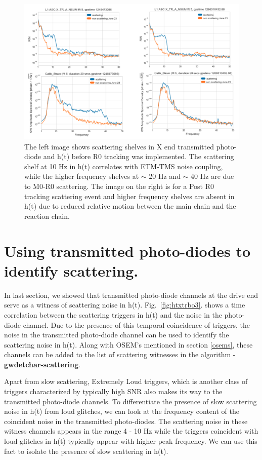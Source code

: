 \documentclass[12pt]{iopart}
\begin{document}
\begin{figure}[h]
    \centering
    \includegraphics[width=\textwidth]{etm-transmon.png}
    \caption{The left image shows scattering shelves in X end transmitted photo-diode and h(t) before R0 tracking was implemented. The scattering shelf at 10 Hz in h(t) correlates with ETM-TMS noise coupling, while the higher frequency shelves at $\sim$ 20 Hz and $\sim$ 40 Hz are due to M0-R0 scattering. The image on the right is for a Post R0 tracking scattering event and higher frequency shelves are absent in h(t) due to reduced relative motion between the main chain and the reaction chain.}
    \label{fig:etm-transmon}
\end{figure}

 
\section{Using transmitted photo-diodes to identify scattering.}\label{transmonwitness}
In last section, we showed that transmitted photo-diode channels at the drive end serve as a witness of scattering noise in h(t). Fig.~\ref{fig:htxtrbo3}. shows a time correlation between the scattering triggers in h(t) and the noise in the photo-diode channel. Due to the presence of this temporal coincidence of triggers, the noise in the transmitted photo-diode channel can be used to identify the scattering noise in h(t). Along with OSEM’s mentioned in section \ref{osems}, these channels can be added to the list of scattering witnesses in the algorithm - \textbf{gwdetchar-scattering}.

Apart from slow scattering, Extremely Loud triggers, which is another class of triggers characterized by typically high SNR also makes its way to the transmitted photo-diode channels. To differentiate the presence of slow scattering noise in h(t) from loud glitches, we can look at the frequency content of the coincident noise in the transmitted photo-diodes. The scattering noise in these witness channels appears in the range  4 - 10 Hz while the triggers coincident with loud glitches in h(t) typically appear with higher peak frequency. We can use this fact to isolate the presence of slow scattering in h(t).
\end{document}
